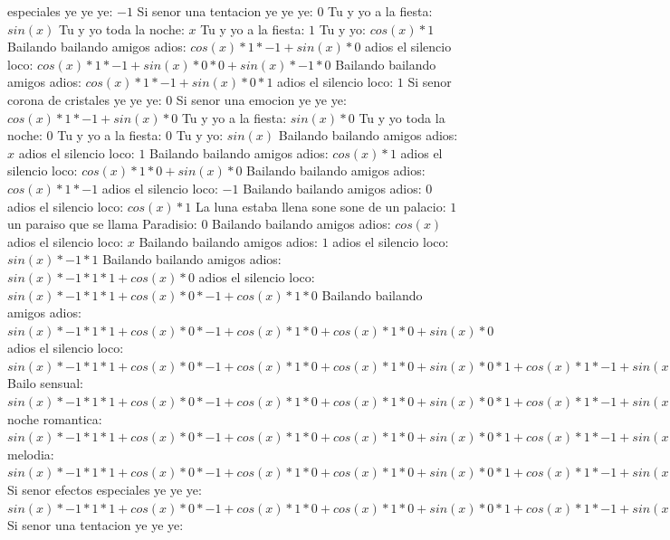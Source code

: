 \documentclass{article}
\begin{document}
especiales ye ye ye: $-1$ Si senor una tentacion ye ye ye: $0$  \newline Tu y yo a la fiesta: $sin(x)$  \newline Tu y yo toda la noche: $x$ Tu y yo a la fiesta: $1$  \newline Tu y yo: $cos(x)*1$ Bailando bailando amigos adios: $cos(x)*1*-1+sin(x)*0$ adios el silencio loco: ${cos(x)*1*-1+sin(x)*0}*0+sin(x)*-1*0$ Bailando bailando amigos adios: ${cos(x)*1*-1+sin(x)*0}*1$ adios el silencio loco: $1$ Si senor corona de cristales ye ye ye: $0$  \newline Si senor una emocion ye ye ye: $cos(x)*1*-1+sin(x)*0$  \newline Tu y yo a la fiesta: $sin(x)*0$ Tu y yo toda la noche: $0$ Tu y yo a la fiesta: $0$  \newline Tu y yo: $sin(x)$  \newline Bailando bailando amigos adios: $x$ adios el silencio loco: $1$  \newline Bailando bailando amigos adios: $cos(x)*1$ adios el silencio loco: $cos(x)*1*0+sin(x)*0$ Bailando bailando amigos adios: $cos(x)*1*-1$ adios el silencio loco: $-1$ Bailando bailando amigos adios: $0$  \newline adios el silencio loco: $cos(x)*1$ La luna estaba llena sone sone de un palacio: $1$ un paraiso que se llama Paradisio: $0$  \newline Bailando bailando amigos adios: $cos(x)$  \newline adios el silencio loco: $x$ Bailando bailando amigos adios: $1$  \newline adios el silencio loco: $sin(x)*-1*1$ Bailando bailando amigos adios: $sin(x)*-1*1*1+cos(x)*0$ adios el silencio loco: ${sin(x)*-1*1*1+cos(x)*0}*-1+cos(x)*1*0$ Bailando bailando amigos adios: ${sin(x)*-1*1*1+cos(x)*0}*-1+cos(x)*1*0+cos(x)*1*0+sin(x)*0$ adios el silencio loco: ${{sin(x)*-1*1*1+cos(x)*0}*-1+cos(x)*1*0+cos(x)*1*0+sin(x)*0}*1+{cos(x)*1*-1+sin(x)*0}*0$ Bailo sensual: ${{sin(x)*-1*1*1+cos(x)*0}*-1+cos(x)*1*0+cos(x)*1*0+sin(x)*0}*1+{cos(x)*1*-1+sin(x)*0}*0+{cos(x)*1*-1+sin(x)*0}*0+sin(x)*-1*0$ noche romantica: ${{{sin(x)*-1*1*1+cos(x)*0}*-1+cos(x)*1*0+cos(x)*1*0+sin(x)*0}*1+{cos(x)*1*-1+sin(x)*0}*0+{cos(x)*1*-1+sin(x)*0}*0+sin(x)*-1*0}*1+{{cos(x)*1*-1+sin(x)*0}*1+sin(x)*-1*0}*0$ melodia: ${{{sin(x)*-1*1*1+cos(x)*0}*-1+cos(x)*1*0+cos(x)*1*0+sin(x)*0}*1+{cos(x)*1*-1+sin(x)*0}*0+{cos(x)*1*-1+sin(x)*0}*0+sin(x)*-1*0}*1+{{cos(x)*1*-1+sin(x)*0}*1+sin(x)*-1*0}*0+{{cos(x)*1*-1+sin(x)*0}*1+sin(x)*-1*0}*0+sin(x)*-1*1*0$ Si senor efectos especiales ye ye ye: ${{{sin(x)*-1*1*1+cos(x)*0}*-1+cos(x)*1*0+cos(x)*1*0+sin(x)*0}*1+{cos(x)*1*-1+sin(x)*0}*0+{cos(x)*1*-1+sin(x)*0}*0+sin(x)*-1*0}*1+{{cos(x)*1*-1+sin(x)*0}*1+sin(x)*-1*0}*0+{{cos(x)*1*-1+sin(x)*0}*1+sin(x)*-1*0}*0+sin(x)*-1*1*0+{{cos(x)*1*-1+sin(x)*0}*1+sin(x)*-1*0}*0+sin(x)*-1*1*0+sin(x)*-1*1*0+cos(x)*0$ Si senor una tentacion ye ye ye: 
\end{document}
